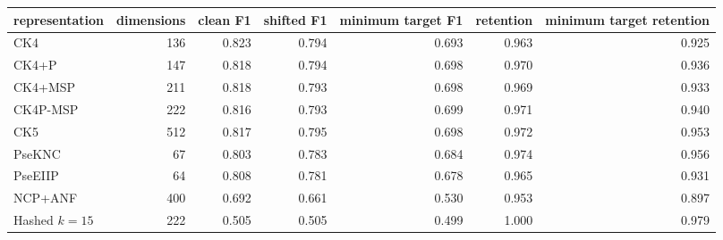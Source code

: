 \begin{tabular}{@{}lrrrrrr@{}}
\toprule
\textbf{representation} & \textbf{dimensions} & \textbf{clean F1} & \textbf{shifted F1} & \textbf{minimum target F1} & \textbf{retention} & \textbf{minimum target retention} \\
\midrule
CK4 & 136 & 0.823 & 0.794 & 0.693 & 0.963 & 0.925 \\
CK4+P & 147 & 0.818 & 0.794 & 0.698 & 0.970 & 0.936 \\
CK4+MSP & 211 & 0.818 & 0.793 & 0.698 & 0.969 & 0.933 \\
CK4P-MSP & 222 & 0.816 & 0.793 & 0.699 & 0.971 & 0.940 \\
CK5 & 512 & 0.817 & 0.795 & 0.698 & 0.972 & 0.953 \\
PseKNC & 67 & 0.803 & 0.783 & 0.684 & 0.974 & 0.956 \\
PseEIIP & 64 & 0.808 & 0.781 & 0.678 & 0.965 & 0.931 \\
NCP+ANF & 400 & 0.692 & 0.661 & 0.530 & 0.953 & 0.897 \\
Hashed $k=15$ & 222 & 0.505 & 0.505 & 0.499 & 1.000 & 0.979 \\
\bottomrule
\end{tabular}
